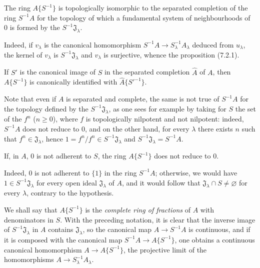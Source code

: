 \begin{proposition}[7.6.2]
\label{0.7.6.2}
The ring $A\{S^{-1}\}$ is topologically isomorphic to the separated completion of
the ring $S^{-1}A$ for the topology of which a fundamental system of neighbourhoods
of 0 is formed by the $S^{-1}\mathfrak J_\lambda$.
\end{proposition}

Indeed, if $v_\lambda$ is the canonical homomorphism
$S^{-1}A\to S_\lambda^{-1}A_\lambda$ deduced from $u_\lambda$, the kernel of
$v_\lambda$ is $S^{-1}\mathfrak J_\lambda$ and $v_\lambda$ is surjective,
whence the proposition (7.2.1).

\begin{corollary}[7.6.3]
\label{0.7.6.3}
If $S'$ is the canonical image of $S$ in the separated completion $\widehat A$ of
$A$, then $A\{S^{-1}\}$ is canonically identified with
$\widehat A\{{S'}^{-1}\}$.
\end{corollary}

Note that even if $A$ is separated and complete, the same is not true of
$S^{-1}A$ for the topology defined by the
$S^{-1}\mathfrak J_\lambda$, as one sees for example by taking for $S$
the set of the $f^n$ ($n\geq0$), where $f$ is topologically nilpotent and not
nilpotent: indeed, $S^{-1}A$ does not reduce to 0, and on the other hand, for every
$\lambda$ there exists $n$ such that $f^n\in\mathfrak J_\lambda$, hence
$1=f^n/f^n\in S^{-1}\mathfrak J_\lambda$ and
$S^{-1}\mathfrak J_\lambda=S^{-1}A$.


\begin{corollary}[7.6.4]
\label{0.7.6.4}
If, in $A$, $0$ is not adherent to $S$, the ring $A\{S^{-1}\}$ does not
reduce to $0$.
\end{corollary}

Indeed, $0$ is not adherent to $\{1\}$ in the ring $S^{-1}A$; otherwise,
we would have $1\in S^{-1}\mathfrak J_\lambda$ for every open ideal
$\mathfrak J_\lambda$ of $A$, and it would follow that
$\mathfrak J_\lambda\cap S\neq\varnothing$ for every $\lambda$, contrary
to the hypothesis.

\begin{env}[7.6.5]
\label{0.7.6.5}
We shall say that $A\{S^{-1}\}$ is the \emph{complete ring of fractions} of $A$
with denominators in $S$. With the preceding notation, it is clear
that the inverse image of $S^{-1}\mathfrak J_\lambda$ in $A$ contains
$\mathfrak J_\lambda$, so the canonical map $A\to S^{-1}A$ is
continuous, and if it is composed with the canonical map
$S^{-1}A\to A\{S^{-1}\}$, one obtains a continuous canonical homomorphism
$A\to A\{S^{-1}\}$, the projective limit of the homomorphisms
$A\to S_\lambda^{-1}A_\lambda$.
\end{env}

